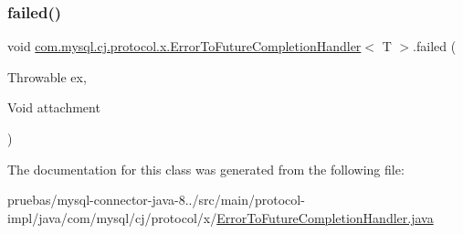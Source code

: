 \subsubsection{\texorpdfstring{failed()}{failed()}}
{\footnotesize\ttfamily void \mbox{\hyperlink{classcom_1_1mysql_1_1cj_1_1protocol_1_1x_1_1_error_to_future_completion_handler}{com.\+mysql.\+cj.\+protocol.\+x.\+Error\+To\+Future\+Completion\+Handler}}$<$ T $>$.failed (\begin{DoxyParamCaption}\item[{Throwable}]{ex,  }\item[{Void}]{attachment }\end{DoxyParamCaption})}



The documentation for this class was generated from the following file\+:\begin{DoxyCompactItemize}
\item 
pruebas/mysql-\/connector-\/java-\/8../src/main/protocol-\/impl/java/com/mysql/cj/protocol/x/\mbox{\hyperlink{_error_to_future_completion_handler_8java}{Error\+To\+Future\+Completion\+Handler.\+java}}\end{DoxyCompactItemize}
